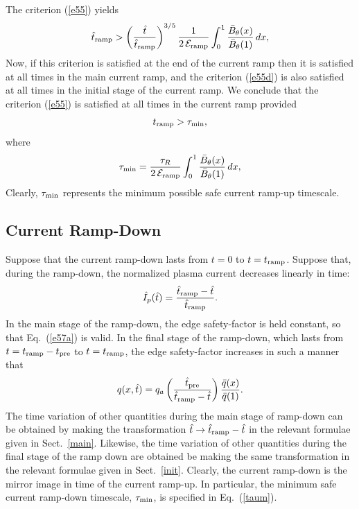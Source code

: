 \documentclass[12pt,prb,aps]{revtex4-1}
\begin{document}
The criterion (\ref{e55}) yields
\begin{equation}
\hat{t}_{\rm ramp} > \left(\frac{\hat{t}}{\hat{t}_{\rm ramp}}\right)^{3/5}\frac{1}{2\,{\cal E}_{\rm ramp}}\int_0^1\frac{\bar{B}_{\theta}(x)}{\bar{B}_\theta(1)}\,dx,
\end{equation}
Now, if this criterion is satisfied at the end of the current ramp then it is satisfied at all times in the main current ramp, and the criterion (\ref{e55d})
is also satisfied at all times in the initial stage of the current ramp. 
We conclude that the criterion (\ref{e55}) is satisfied at all times in the current ramp provided 
\begin{equation}
t_{\rm ramp} > \tau_{\rm min},
\end{equation}
where \begin{equation}\label{taum}
\tau_{\rm min}= \frac{\tau_R}{2\,{\cal E}_{\rm ramp}}\int_0^1\frac{\bar{B}_{\theta}(x)}{\bar{B}_\theta(1)}\,dx,
\end{equation}
Clearly, $\tau_{\rm min}$ represents the minimum possible safe current ramp-up timescale. 

\subsection{Current Ramp-Down}
Suppose that the current ramp-down lasts from $t=0$ to $t=t_{\rm ramp}$. Suppose that, during the ramp-down, 
the normalized plasma current decreases linearly in time:
\begin{equation}
\hat{I}_p(\hat{t}) = \frac{\hat{t}_{\rm ramp}-\hat{t}}{\hat{t}_{\rm ramp}}.
\end{equation}
In the main stage of the ramp-down, the edge safety-factor is held constant, so that Eq.~(\ref{e57a}) is valid.
In the final stage of the ramp-down, which lasts from $t=t_{\rm ramp}-t_{\rm pre}$ to $t=t_{\rm ramp}$,
the edge safety-factor increases in such a manner that 
\begin{equation}
q(x,\hat{t}) = q_a\left(\frac{\hat{t}_{\rm pre}}{\hat{t}_{\rm ramp}-\hat{t}}\right)\frac{\bar{q}(x)}{\bar{q}(1)}.
\end{equation}
The time variation of other quantities during the main stage of ramp-down can be obtained by making the transformation
$\hat{t}\rightarrow \hat{t}_{\rm ramp} - \hat{t}$ in the relevant formulae  given in Sect.~\ref{main}. Likewise,
the time variation of other quantities during the final stage of the ramp down are obtained be making the
same transformation in the relevant formulae given in Sect.~\ref{init}. Clearly, the current ramp-down is the mirror image in time of the current ramp-up.
In particular, the minimum safe current
ramp-down timescale, $\tau_{\rm min}$, is specified in Eq.~(\ref{taum}). 
\end{document}

